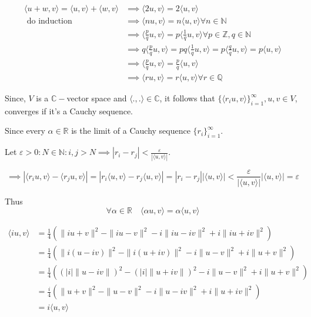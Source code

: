 \documentclass{article}
\newcommand\N{\mathbb{N}}
\newcommand\Z{\mathbb{Z}}
\newcommand\Q{\mathbb{Q}}
\newcommand\R{\mathbb{R}}
\newcommand\C{\mathbb{C}}
\begin{document}
\newpage
\begin{align*}
  \langle u+w,v \rangle = \langle u,v \rangle +\langle w,v \rangle
  &\implies \langle 2u,v \rangle = 2\langle u,v \rangle\\
  \text{ do induction }& \implies \langle nu,v \rangle = n\langle u,v
                         \rangle \forall n\in \N\\
                         &\implies \langle \frac{p}{q}u,v \rangle =
                           p\langle \frac{1}{q} u,v
                           \rangle \forall p\in \Z,q\in \N\\
                         &\implies q\langle \frac{p}{q}u,v \rangle =
                           pq\langle \frac{1}{q} u,v
                           \rangle = p\langle \frac{q}{q} u,v
                           \rangle = p\langle u,v
                           \rangle \\
     &\implies \langle \frac{p}{q}u,v \rangle =
                           \frac{p}{q} \langle u,v
       \rangle \\
  &\implies \langle ru,v \rangle = r\langle u,v \rangle \forall r\in \Q
  \end{align*}

Since, $V$ is a $\C-$vector space and $\langle .,. \rangle \in \C$, it
follows that $\{\langle r_i u,v
\rangle\}_{i=1}^\infty, u,v \in V$, converges if it's a Cauchy
sequence.

Since every $\alpha \in \R$ is the limit of a Cauchy sequence $\{r_i\}_{i=1}^\infty$.

Let $\varepsilon>0: N\in \N: i,j>N \implies |r_i-r_j|<\frac{\varepsilon}{|\langle u,v \rangle|}$.

\[\implies |\langle r_i u,v
\rangle -\langle r_j u,v
\rangle| = |r_i \langle u,v
\rangle - r_j\langle u,v
\rangle| = |r_i  - r_j||\langle u,v
\rangle| < \frac{\varepsilon}{|\langle u,v
\rangle|} |\langle u,v
\rangle| = \varepsilon \]

Thus
\begin{equation}
\forall \alpha \in \R\quad \langle \alpha u,v \rangle = \alpha \langle u,v \rangle
\end{equation}


\begin{align*}
  \langle iu,v \rangle &={\frac
                         {1}{4}}\left(\|iu+v\|^{2}-\|iu-v\|^{2}-i\|iu-iv\|^{2}+i\|iu+iv\|^{2}\right)\\
  &={\frac
    {1}{4}}\left(\|i(u-iv)\|^{2}-\|i(u+iv)\|^{2}-i\|u-v\|^{2}+i\|u+v\|^{2}\right)\\
  &={\frac
    {1}{4}}\left((|i|\|u-iv\|)^{2}-(|i|\|u+iv\|)^{2}-i\|u-v\|^{2}+i\|u+v\|^{2}\right)\\
  &={\frac
                         {i}{4}}\left(\|u+v\|^{2}-\|u-v\|^{2}-i\|u-iv\|^{2}+i\|u+iv\|^{2}\right)\\
  &= i\langle u,v \rangle
\end{align*}
\end{document}

